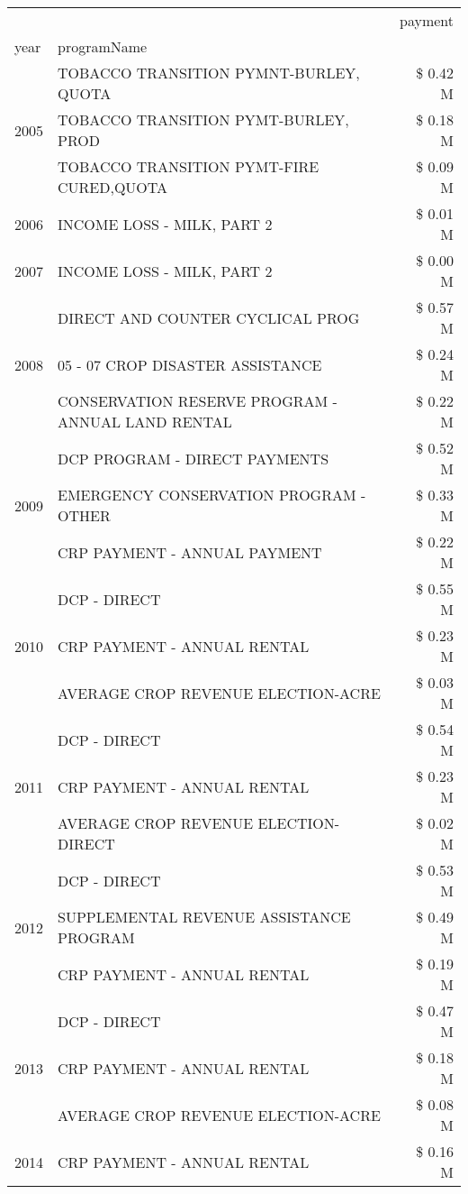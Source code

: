 \begin{tabular}{llr}
\toprule
 &  & payment \\
year & programName &  \\
\midrule
\multirow[t]{3}{*}{2005} & TOBACCO TRANSITION PYMNT-BURLEY, QUOTA & \$ 0.42 M \\
 & TOBACCO TRANSITION PYMT-BURLEY, PROD & \$ 0.18 M \\
 & TOBACCO TRANSITION PYMT-FIRE CURED,QUOTA & \$ 0.09 M \\
\cline{1-3}
2006 & INCOME LOSS - MILK, PART 2 & \$ 0.01 M \\
\cline{1-3}
2007 & INCOME LOSS - MILK, PART 2 & \$ 0.00 M \\
\cline{1-3}
\multirow[t]{3}{*}{2008} & DIRECT AND COUNTER CYCLICAL PROG & \$ 0.57 M \\
 & 05 - 07 CROP DISASTER ASSISTANCE & \$ 0.24 M \\
 & CONSERVATION RESERVE PROGRAM - ANNUAL LAND RENTAL & \$ 0.22 M \\
\cline{1-3}
\multirow[t]{3}{*}{2009} & DCP PROGRAM - DIRECT PAYMENTS & \$ 0.52 M \\
 & EMERGENCY CONSERVATION PROGRAM - OTHER & \$ 0.33 M \\
 & CRP PAYMENT - ANNUAL PAYMENT & \$ 0.22 M \\
\cline{1-3}
\multirow[t]{3}{*}{2010} & DCP - DIRECT & \$ 0.55 M \\
 & CRP PAYMENT - ANNUAL RENTAL & \$ 0.23 M \\
 & AVERAGE CROP REVENUE ELECTION-ACRE & \$ 0.03 M \\
\cline{1-3}
\multirow[t]{3}{*}{2011} & DCP - DIRECT & \$ 0.54 M \\
 & CRP PAYMENT - ANNUAL RENTAL & \$ 0.23 M \\
 & AVERAGE CROP REVENUE ELECTION-DIRECT & \$ 0.02 M \\
\cline{1-3}
\multirow[t]{3}{*}{2012} & DCP - DIRECT & \$ 0.53 M \\
 & SUPPLEMENTAL REVENUE ASSISTANCE PROGRAM & \$ 0.49 M \\
 & CRP PAYMENT - ANNUAL RENTAL & \$ 0.19 M \\
\cline{1-3}
\multirow[t]{3}{*}{2013} & DCP - DIRECT & \$ 0.47 M \\
 & CRP PAYMENT - ANNUAL RENTAL & \$ 0.18 M \\
 & AVERAGE CROP REVENUE ELECTION-ACRE & \$ 0.08 M \\
\cline{1-3}
\multirow[t]{3}{*}{2014} & CRP PAYMENT - ANNUAL RENTAL & \$ 0.16 M \\

\end{tabular}
